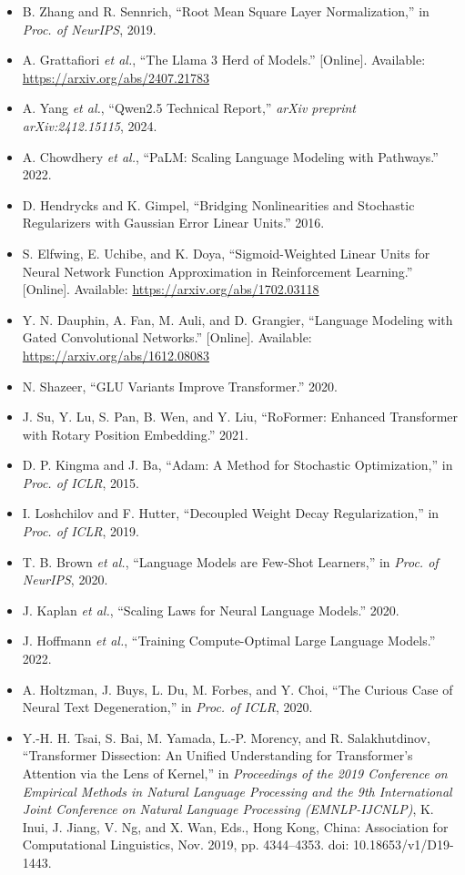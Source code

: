 \begin{itemize}[leftmargin=3em, label={}]
  \item[\tm{[13]}] B. Zhang and R. Sennrich, ``Root Mean Square Layer Normalization,'' in \textit{Proc. of NeurIPS}, 2019.
  \item[\tm{[14]}] A. Grattafiori \textit{et al.}, ``The Llama 3 Herd of Models.'' [Online]. Available: \url{https://arxiv.org/abs/2407.21783}
  \item[\tm{[15]}] A. Yang \textit{et al.}, ``Qwen2.5 Technical Report,'' \textit{arXiv preprint arXiv:2412.15115}, 2024.
  \item[\tm{[16]}] A. Chowdhery \textit{et al.}, ``PaLM: Scaling Language Modeling with Pathways.'' 2022.
  \item[\tm{[17]}] D. Hendrycks and K. Gimpel, ``Bridging Nonlinearities and Stochastic Regularizers with Gaussian Error Linear Units.'' 2016.
  \item[\tm{[18]}] S. Elfwing, E. Uchibe, and K. Doya, ``Sigmoid-Weighted Linear Units for Neural Network Function Approximation in Reinforcement Learning.'' [Online]. Available: \url{https://arxiv.org/abs/1702.03118}
  \item[\tm{[19]}] Y. N. Dauphin, A. Fan, M. Auli, and D. Grangier, ``Language Modeling with Gated Convolutional Networks.'' [Online]. Available: \url{https://arxiv.org/abs/1612.08083}
  \item[\tm{[20]}] N. Shazeer, ``GLU Variants Improve Transformer.'' 2020.
  \item[\tm{[21]}] J. Su, Y. Lu, S. Pan, B. Wen, and Y. Liu, ``RoFormer: Enhanced Transformer with Rotary Position Embedding.'' 2021.
  \item[\tm{[22]}] D. P. Kingma and J. Ba, ``Adam: A Method for Stochastic Optimization,'' in \textit{Proc. of ICLR}, 2015.
  \item[\tm{[23]}] I. Loshchilov and F. Hutter, ``Decoupled Weight Decay Regularization,'' in \textit{Proc. of ICLR}, 2019.
  \item[\tm{[24]}] T. B. Brown \textit{et al.}, ``Language Models are Few-Shot Learners,'' in \textit{Proc. of NeurIPS}, 2020.
  \item[\tm{[25]}] J. Kaplan \textit{et al.}, ``Scaling Laws for Neural Language Models.'' 2020.
  \item[\tm{[26]}] J. Hoffmann \textit{et al.}, ``Training Compute-Optimal Large Language Models.'' 2022.
  \item[\tm{[27]}] A. Holtzman, J. Buys, L. Du, M. Forbes, and Y. Choi, ``The Curious Case of Neural Text Degeneration,'' in \textit{Proc. of ICLR}, 2020.
  \item[\tm{[28]}] Y.-H. H. Tsai, S. Bai, M. Yamada, L.-P. Morency, and R. Salakhutdinov, ``Transformer Dissection: An Unified Understanding for Transformer's Attention via the Lens of Kernel,'' in \textit{Proceedings of the 2019 Conference on Empirical Methods in Natural Language Processing and the 9th International Joint Conference on Natural Language Processing (EMNLP-IJCNLP)}, K. Inui, J. Jiang, V. Ng, and X. Wan, Eds., Hong Kong, China: Association for Computational Linguistics, Nov. 2019, pp. 4344--4353. doi: 10.18653/v1/D19-1443.

\end{itemize}
